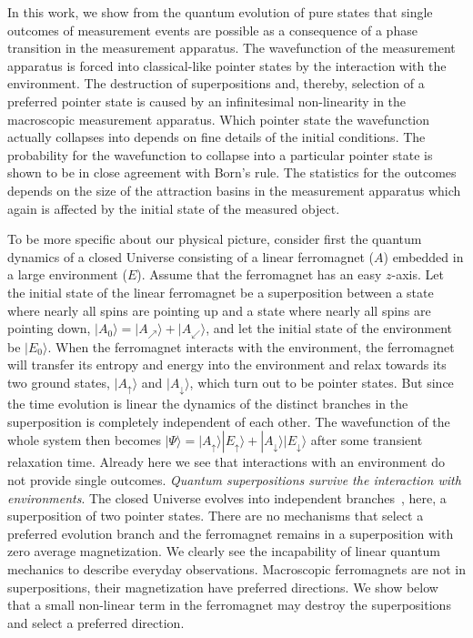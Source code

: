 \documentclass[showpacs,preprintnumbers,amsmath,amssymb,12pt]{revtex4-2}
\begin{document}
In this work, we show from the quantum evolution of pure states that
single outcomes of measurement events are possible as a consequence of
a phase transition in the measurement apparatus. The wavefunction of
the measurement apparatus is forced into classical-like pointer states
by the interaction with the environment. The destruction of
superpositions and, thereby, selection of a preferred pointer state is
caused by an infinitesimal non-linearity in the macroscopic
measurement apparatus. Which pointer state the wavefunction actually
collapses into depends on fine details of the initial conditions. The
probability for the wavefunction to collapse into a particular pointer
state is shown to be in close agreement with Born's rule. The
statistics for the outcomes depends on the size of the attraction
basins in the measurement apparatus which again is affected by the
initial state of the measured object.

To be more specific about our physical picture, consider first the
quantum dynamics of a closed Universe consisting of a linear
ferromagnet ($A$) embedded in a large environment ($E$). Assume that
the ferromagnet has an easy $z$-axis. Let the initial state of the
linear ferromagnet be a superposition between a state where nearly all
spins are pointing up and a state where nearly all spins are pointing
down, $|A_0 \rangle = | A_\nearrow \rangle + |A_\swarrow \rangle$, and
let the initial state of the environment be $|E_0 \rangle$. When the
ferromagnet interacts with the environment, the ferromagnet will
transfer its entropy and energy into the environment and relax towards
its two ground states, $ |A_\uparrow \rangle $ and $ |A_\downarrow
\rangle $, which turn out to be pointer states. But since the time
evolution is linear the dynamics of the distinct branches in the
superposition is completely independent of each other.  The
wavefunction of the whole system then becomes $|\Psi \rangle =
|A_\uparrow \rangle |E_\uparrow \rangle + |A_\downarrow \rangle
|E_\downarrow \rangle$ after some transient relaxation time. Already
here we see that interactions with an environment do not provide
single outcomes. {\em Quantum superpositions survive the interaction
  with environments}. The closed Universe evolves into independent
branches~\cite{everett}, here, a superposition of two pointer
states. There are no mechanisms that select a preferred evolution
branch and the ferromagnet remains in a superposition with zero
average magnetization. We clearly see the incapability of linear
quantum mechanics to describe everyday observations. Macroscopic
ferromagnets are not in superpositions, their magnetization have
preferred directions. We show below that a small non-linear term in
the ferromagnet may destroy the superpositions and select a preferred
direction.
\end{document}
